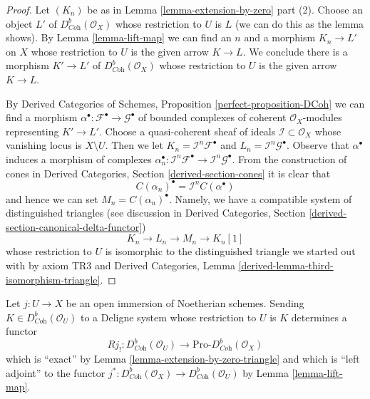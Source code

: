 \begin{proof}
Let $(K_n)$ be as in Lemma \ref{lemma-extension-by-zero} part (2).
Choose an object $L'$ of $D^b_{\textit{Coh}}(\mathcal{O}_X)$
whose restriction to $U$ is $L$ (we can do this as the lemma shows).
By Lemma \ref{lemma-lift-map} we can find an $n$ and a morphism
$K_n \to L'$ on $X$ whose restriction to $U$ is the given arrow
$K \to L$. We conclude there is a morphism $K' \to L'$ of
$D^b_{\textit{Coh}}(\mathcal{O}_X)$ whose restriction to $U$
is the given arrow $K \to L$.

\medskip\noindent
By Derived Categories of Schemes, Proposition \ref{perfect-proposition-DCoh}
we can find a morphism $\alpha^\bullet : \mathcal{F}^\bullet \to
\mathcal{G}^\bullet$ of bounded complexes
of coherent $\mathcal{O}_X$-modules representing $K' \to L'$.
Choose a quasi-coherent sheaf of ideals $\mathcal{I} \subset \mathcal{O}_X$
whose vanishing locus is $X \setminus U$.
Then we let
$K_n = \mathcal{I}^n\mathcal{F}^\bullet$
and
$L_n = \mathcal{I}^n\mathcal{G}^\bullet$.
Observe that $\alpha^\bullet$ induces a morphism of
complexes $\alpha_n^\bullet : \mathcal{I}^n\mathcal{F}^\bullet \to
\mathcal{I}^n\mathcal{G}^\bullet$. From the construction of cones in
Derived Categories, Section \ref{derived-section-cones}
it is clear that
$$
C(\alpha_n)^\bullet = \mathcal{I}^nC(\alpha^\bullet)
$$
and hence we can set $M_n = C(\alpha_n)^\bullet$. Namely, we
have a compatible system of distinguished triangles
(see discussion in Derived Categories, Section
\ref{derived-section-canonical-delta-functor})
$$
K_n \to L_n \to M_n \to K_n[1]
$$
whose restriction to $U$ is isomorphic to the distinguished 
triangle we started out with by axiom TR3 and Derived Categories,
Lemma \ref{derived-lemma-third-isomorphism-triangle}.
\end{proof}

\begin{remark}
\label{remark-extension-by-zero}
Let $j : U \to X$ be an open immersion of Noetherian schemes.
Sending $K \in D^b_{\textit{Coh}}(\mathcal{O}_U)$ to a Deligne
system whose restriction to $U$ is $K$ determines a functor
$$
Rj_! :
D^b_{\textit{Coh}}(\mathcal{O}_U)
\longrightarrow
\text{Pro-}D^b_{\textit{Coh}}(\mathcal{O}_X)
$$
which is ``exact'' by Lemma \ref{lemma-extension-by-zero-triangle} and
which is
``left adjoint'' to the functor
$j^* : D^b_{\textit{Coh}}(\mathcal{O}_X) \to
D^b_{\textit{Coh}}(\mathcal{O}_U)$ by Lemma \ref{lemma-lift-map}.
\end{remark}

